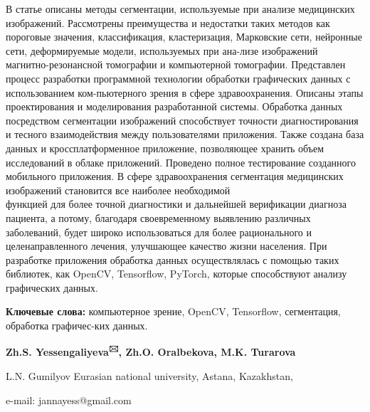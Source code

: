 В статье описаны методы сегментации, используемые при анализе
медицинских изображений. Рассмотрены преимущества и недостатки таких
методов как пороговые значения, классификация, кластеризация, Марковские
сети, нейронные сети, деформируемые модели, используемых при ана-лизе
изображений магнитно-резонансной томографии и компьютерной томографии.
Представлен процесс разработки программной технологии обработки
графических данных с использованием ком-пьютерного зрения в сфере
здравоохранения. Описаны этапы проектирования и моделирования
разработанной системы. Обработка данных посредством сегментации
изображений способствует точности диагностирования и тесного
взаимодействия между пользователями приложения. Также создана база
данных и кроссплатформенное приложение, позволяющее хранить объем
исследований в облаке приложений. Проведено полное тестирование
созданного мобильного приложения. В сфере здравоохранения сегментация
медицинских изображений становится все наиболее необходимой \\функцией для
более точной диагностики и дальнейшей верификации диагноза пациента, а
потому, благодаря своевременному выявлению различных заболеваний, будет
широко использоваться для более рационального и целенаправленного
лечения, улучшающее качество жизни населения. При разработке приложения
обработка данных осуществлялась с помощью таких библиотек, как OpenCV,
Tensorflow, PyTorch, которые способствуют анализу графических данных.

{\bfseries Ключевые слова:} компьютерное зрение, OpenCV, Tensorflow,
сегментация, обработка графичес-ких данных.


\begin{center}
{\bfseries Zh.S. Yessengaliyeva\textsuperscript{🖂}, Zh.O. Oralbekova, M.K.
Turarova}

L.N. Gumilyov Eurasian national university, Astana, Kazakhstan,

e-mail: jannayess@gmail.com
\end{center}

